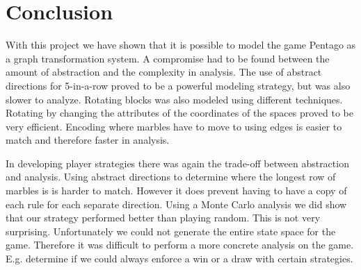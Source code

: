 \section{Conclusion}
\label{Conclusion}

With this project we have shown that it is possible to model the game Pentago as a graph transformation system.
A compromise had to be found between the amount of abstraction and the complexity in analysis. The use of abstract directions for 5-in-a-row proved to be a powerful modeling strategy, but was also slower to analyze. 
Rotating blocks was also modeled using different techniques. Rotating by changing the attributes of the coordinates of the spaces proved to be very efficient. Encoding where marbles have to move to using edges is easier to match and therefore faster in analysis.

In developing player strategies there was again the trade-off between abstraction and analysis. Using abstract directions to determine where the longest row of marbles is is harder to match. However it does prevent having to have a copy of each rule for each separate direction.
Using a Monte Carlo analysis we did show that our strategy performed better than playing random. This is not very surprising.
Unfortunately we could not generate the entire state space for the game. Therefore it was difficult to perform a more concrete analysis on the game. E.g. determine if we could always enforce a win or a draw with certain strategies.

